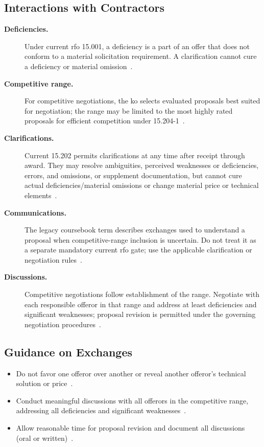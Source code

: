 \documentclass[../main.tex]{subfiles}
\begin{document}
\subsection{Interactions with Contractors}
\begin{description}
  \item[\textbf{Deficiencies.}] Under current \ac{rfo} 15.001, a deficiency is a part of an offer that does not conform to a material solicitation requirement. A clarification cannot cure a deficiency or material omission~\autocite{FAR-Overhaul-Part15-2026}.
  \item[\textbf{Competitive range.}] For competitive negotiations, the \ac{ko} selects evaluated proposals best suited for negotiation; the range may be limited to the most highly rated proposals for efficient competition under 15.204-1~\autocite{FAR-Overhaul-Part15-2026}.
  \item[\textbf{Clarifications.}] Current 15.202 permits clarifications at any time after receipt through award. They may resolve ambiguities, perceived weaknesses or deficiencies, errors, and omissions, or supplement documentation, but cannot cure actual deficiencies/material omissions or change material price or technical elements~\autocite{FAR-Overhaul-Part15-2026}.
  \item[\textbf{Communications.}] The legacy coursebook term describes exchanges used to understand a proposal when competitive-range inclusion is uncertain. Do not treat it as a separate mandatory current \ac{rfo} gate; use the applicable clarification or negotiation rules~\autocite{edo-3-2-3-source-selection-2025,FAR-Overhaul-Part15-2026}.
  \item[\textbf{Discussions.}] Competitive negotiations follow establishment of the range. Negotiate with each responsible offeror in that range and address at least deficiencies and significant weaknesses; proposal revision is permitted under the governing negotiation procedures~\autocite{FAR-Overhaul-Part15-2026}.
\end{description}

\subsection{Guidance on Exchanges}
\begin{itemize}
  \item Do not favor one offeror over another or reveal another offeror's technical solution or price~\autocite{edo-3-2-3-source-selection-2025,FAR-15-306-Exchanges}.
  \item Conduct meaningful discussions with all offerors in the competitive range, addressing all deficiencies and significant weaknesses~\autocite{edo-3-2-3-source-selection-2025,FAR-15-306-Exchanges}.
  \item Allow reasonable time for proposal revision and document all discussions (oral or written)~\autocite{edo-3-2-3-source-selection-2025,FAR-15-306-Exchanges}.
\end{itemize}
\end{document}
